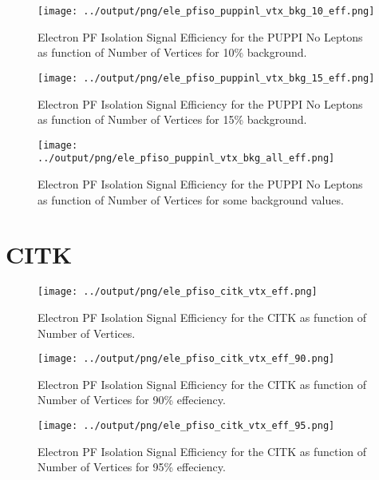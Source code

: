 \documentclass[11pt]{book}
\begin{document}
\begin{figure}[htb]
\centering
\texttt{[image: ../output/png/ele\_pfiso\_puppinl\_vtx\_bkg\_10\_eff.png]}
\caption{Electron PF Isolation Signal Efficiency for the PUPPI No Leptons as function of Number of Vertices for 10\% background.}
\label{fig:ele_pfiso_vtx_eff_puppinl_bkg_10_eff}
\end{figure}

\begin{figure}[htb]
\centering
\texttt{[image: ../output/png/ele\_pfiso\_puppinl\_vtx\_bkg\_15\_eff.png]}
\caption{Electron PF Isolation Signal Efficiency for the PUPPI No Leptons as function of Number of Vertices for 15\% background.}
\label{fig:ele_pfiso_vtx_eff_puppinl_bkg_15_eff}
\end{figure}

\begin{figure}[htb]
\centering
\texttt{[image: ../output/png/ele\_pfiso\_puppinl\_vtx\_bkg\_all\_eff.png]}
\caption{Electron PF Isolation Signal Efficiency for the PUPPI No Leptons as function of Number of Vertices for some background values.}
\label{fig:ele_pfiso_vtx_eff_puppinl_bkg_all_eff}
\end{figure}
\clearpage

\section{CITK}
\begin{figure}[htb]
\centering
\texttt{[image: ../output/png/ele\_pfiso\_citk\_vtx\_eff.png]}
\caption{Electron PF Isolation Signal Efficiency for the CITK as function of Number of Vertices.}
\label{fig:ele_pfiso_vtx_eff_citk}
\end{figure}

\begin{figure}[htb]
\centering
\texttt{[image: ../output/png/ele\_pfiso\_citk\_vtx\_eff\_90.png]}
\caption{Electron PF Isolation Signal Efficiency for the CITK as function of Number of Vertices for 90\% effeciency.}
\label{fig:ele_pfiso_vtx_eff_citk_eff_90}
\end{figure}

\begin{figure}[htb]
\centering
\texttt{[image: ../output/png/ele\_pfiso\_citk\_vtx\_eff\_95.png]}
\caption{Electron PF Isolation Signal Efficiency for the CITK as function of Number of Vertices for 95\% effeciency.}
\label{fig:ele_pfiso_vtx_eff_citk_eff_95}
\end{figure}
\end{document}
